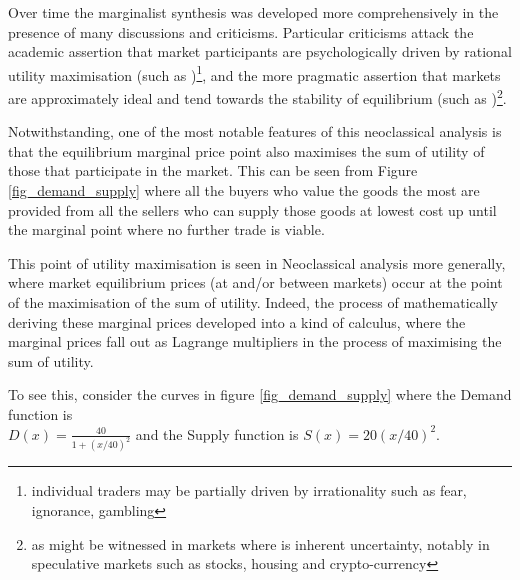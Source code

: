 Over time the marginalist synthesis was developed more comprehensively in the presence of many discussions and criticisms.
Particular criticisms attack the academic assertion that market participants are psychologically driven by rational utility maximisation (such as \cite{RePEc:ucp:jpolec:v:58:y:1950:p:307})\footnote{individual traders may be partially driven by irrationality such as fear, ignorance, gambling}, and the more pragmatic assertion that markets are approximately ideal and tend towards the stability of equilibrium (such as \cite{nla.cat-vn5739105})\footnote{as might be witnessed in markets where is inherent uncertainty, notably in speculative markets such as stocks, housing and crypto-currency}.



Notwithstanding, one of the most notable features of this neoclassical analysis is that the equilibrium marginal price point also maximises the sum of utility of those that participate in the market.
This can be seen from Figure \ref{fig_demand_supply} where all the buyers who value the goods the most are provided from all the sellers who can supply those goods at lowest cost up until the marginal point where no further trade is viable.

This point of utility maximisation is seen in Neoclassical analysis more generally, where market equilibrium prices (at and/or between markets) occur at the point of the maximisation of the sum of utility. Indeed, the process of mathematically deriving these marginal prices developed into a kind of calculus, where the marginal prices fall out as Lagrange multipliers in the process of maximising the sum of utility.

To see this, consider the curves in figure \ref{fig_demand_supply} where the Demand function is\\ $D(x) = \frac{40}{1+(x/40)^2}$ and the Supply function is $S(x) = 20(x/40)^2$.


